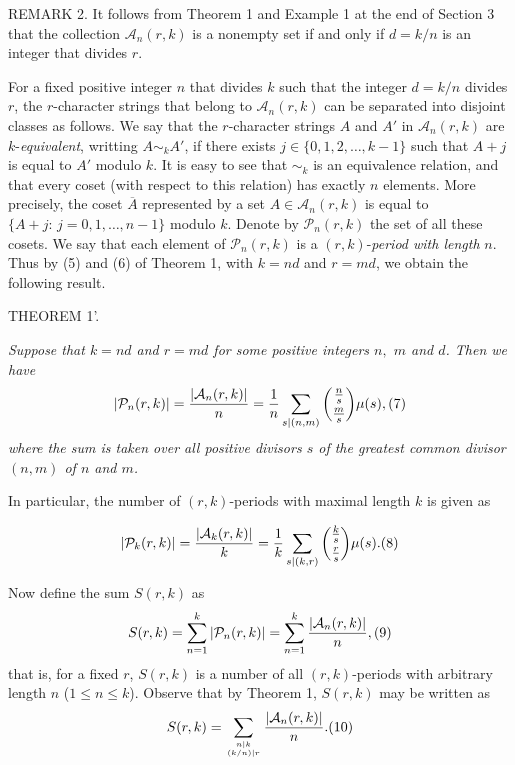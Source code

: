 \documentclass[12pt]{amsart}
\begin{document}
{\vspace{2mm}

R{\scriptsize EMARK}  2. It follows from Theorem 1 and Example 1  at the end
of Section 3 that the collection ${\mathcal A}_n(r,k)$ is  a nonempty   set 
if and only if $d=k/n$ is an integer that divides $r$.

\vspace{2mm}

For a fixed positive integer $n$ that  divides $k$ such that 
the integer $d=k/n$ divides $r$,  
the $r$-character strings that belong to  ${\mathcal A}_n(r,k)$  can be 
separated into disjoint classes as follows. 
 We say that the $r$-character strings $A$ and $A'$ in ${\mathcal A}_n(r,k)$ 
are $k$-{\it equivalent}, writting $A\sim_k A'$,  
if there exists   $j\in\{0,1,2,\ldots,k-1\}$ such that $A+j$ is equal to $A'$ 
modulo $k$. It is easy to see that  $\sim_k$ is an   equivalence relation, and
that every coset (with respect to this relation) 
has exactly $n$ elements. More precisely, the coset $\overline{A}$ represented
by a set $A\in {\mathcal A}_n(r,k)$ is equal  to 
$\{A+j:\,j=0,1,\ldots,n-1\}$ modulo $k$.
Denote by ${\mathcal P}_n(r,k)$ the set of
all these  cosets. We say  that each element of ${\mathcal P}_n(r,k)$ 
is a $(r,k)$-{\it period with length}  $n$. Thus by (5) and (6) 
of Theorem 1, with $k=nd$ and $r=md$, 
we obtain the following result.

\vspace{2mm}

T{\scriptsize HEOREM} 1'.
{\it Suppose that  $k=nd$ and $r=md$ for some positive integers  
$n,$ $m$ and $d$.
Then we have
  $$
|{\mathcal P}_n(r,k)|=\frac{|{\mathcal A}_n(r,k)|}{n}=\frac{1}{n}
\sum_{s|(n,m)}{\frac{n}{s}\choose\frac{m}{s}}\mu(s),
\relax(7)
 $$
where  the sum is taken
over all positive divisors $s$ of the greatest common divisor $(n,m)$ of $n$ 
and $m$.

In particular, the number of $(r,k)$-periods with maximal length  $k$
is given as}
$$
|{\mathcal P}_k(r,k)|=\frac{|{\mathcal A}_k(r,k)|}{k}=\frac{1}{k}
\sum_{s|(k,r)}{\frac{k}{s}\choose\frac{r}{s}}\mu(s).
\relax(8)
 $$    

Now define the sum $S(r,k)$ as  
$$
 S(r,k)=\sum_{n=1}^{k}|{\mathcal P}_n(r,k)|=\sum_{n=1}^{k}
\frac{|{\mathcal A}_n(r,k)|}{n},\relax(9)
$$
 that is, for a fixed $r$, $S(r,k)$ 
is a  number of all $(r,k)$-periods with arbitrary length $n$ ($1\le n\le k$).
Observe that by Theorem 1, $S(r,k)$ may be written as  
 $$
 S(r,k)=\sum_{n\mid k\atop (k/n)|r}\frac{|{\mathcal A}_n(r,k)|}{n}.\relax(10)
$$

}
\end{document}
